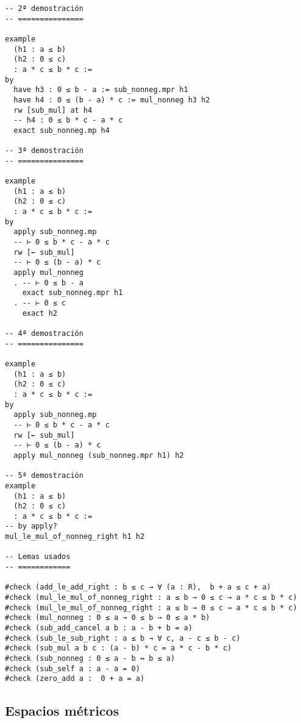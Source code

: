 \begin{verbatim}
-- 2ª demostración
-- ===============

example
  (h1 : a ≤ b)
  (h2 : 0 ≤ c)
  : a * c ≤ b * c :=
by
  have h3 : 0 ≤ b - a := sub_nonneg.mpr h1
  have h4 : 0 ≤ (b - a) * c := mul_nonneg h3 h2
  rw [sub_mul] at h4
  -- h4 : 0 ≤ b * c - a * c
  exact sub_nonneg.mp h4

-- 3ª demostración
-- ===============

example
  (h1 : a ≤ b)
  (h2 : 0 ≤ c)
  : a * c ≤ b * c :=
by
  apply sub_nonneg.mp
  -- ⊢ 0 ≤ b * c - a * c
  rw [← sub_mul]
  -- ⊢ 0 ≤ (b - a) * c
  apply mul_nonneg
  . -- ⊢ 0 ≤ b - a
    exact sub_nonneg.mpr h1
  . -- ⊢ 0 ≤ c
    exact h2

-- 4ª demostración
-- ===============

example
  (h1 : a ≤ b)
  (h2 : 0 ≤ c)
  : a * c ≤ b * c :=
by
  apply sub_nonneg.mp
  -- ⊢ 0 ≤ b * c - a * c
  rw [← sub_mul]
  -- ⊢ 0 ≤ (b - a) * c
  apply mul_nonneg (sub_nonneg.mpr h1) h2

-- 5ª demostración
example
  (h1 : a ≤ b)
  (h2 : 0 ≤ c)
  : a * c ≤ b * c :=
-- by apply?
mul_le_mul_of_nonneg_right h1 h2

-- Lemas usados
-- ============

#check (add_le_add_right : b ≤ c → ∀ (a : R),  b + a ≤ c + a)
#check (mul_le_mul_of_nonneg_right : a ≤ b → 0 ≤ c → a * c ≤ b * c)
#check (mul_le_mul_of_nonneg_right : a ≤ b → 0 ≤ c → a * c ≤ b * c)
#check (mul_nonneg : 0 ≤ a → 0 ≤ b → 0 ≤ a * b)
#check (sub_add_cancel a b : a - b + b = a)
#check (sub_le_sub_right : a ≤ b → ∀ c, a - c ≤ b - c)
#check (sub_mul a b c : (a - b) * c = a * c - b * c)
#check (sub_nonneg : 0 ≤ a - b ↔ b ≤ a)
#check (sub_self a : a - a = 0)
#check (zero_add a :  0 + a = a)
\end{verbatim}

\subsection{Espacios métricos}
\label{sec:orgbd6ccbf}


